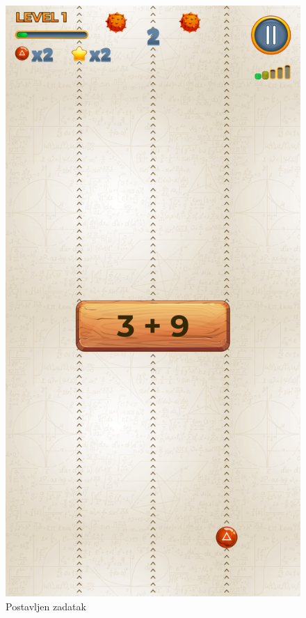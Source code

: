 \documentclass[times, utf8, zavrsni, numeric]{fer}
\begin{document}
			\begin{figure}[!htb]
			\begin{minipage}{0.48\textwidth}
				\centering
				\includegraphics[scale=0.15]{"slike/igre/mathematicalrun1.png"} 
				\caption{Postavljen zadatak}

\end{minipage}
\end{figure}
\end{document}
